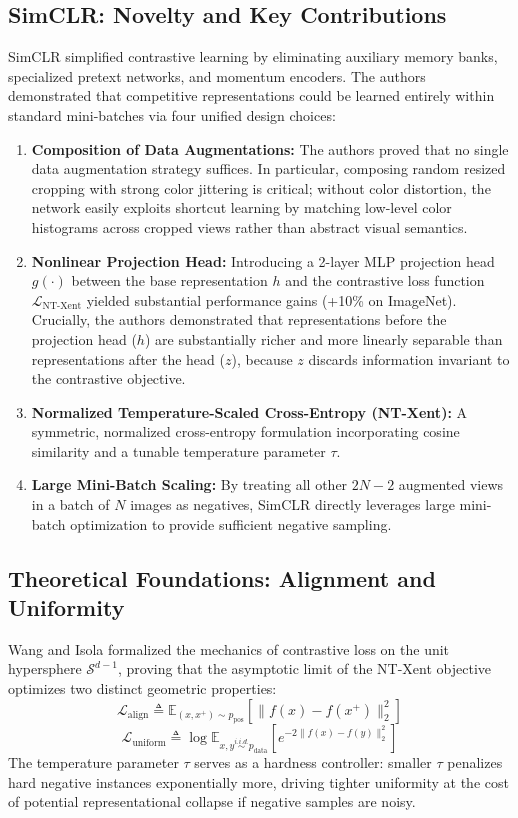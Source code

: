 \documentclass[conference]{IEEEtran}
\begin{document}
\subsection{SimCLR: Novelty and Key Contributions}
SimCLR \cite{chen2020simple} simplified contrastive learning by eliminating auxiliary memory banks, specialized pretext networks, and momentum encoders. The authors demonstrated that competitive representations could be learned entirely within standard mini-batches via four unified design choices:
\begin{enumerate}
    \item \textbf{Composition of Data Augmentations:} The authors proved that no single data augmentation strategy suffices. In particular, composing random resized cropping with strong color jittering is critical; without color distortion, the network easily exploits shortcut learning by matching low-level color histograms across cropped views rather than abstract visual semantics.
    \item \textbf{Nonlinear Projection Head:} Introducing a 2-layer MLP projection head $g(\cdot)$ between the base representation $h$ and the contrastive loss function $\mathcal{L}_{\text{NT-Xent}}$ yielded substantial performance gains (+10\% on ImageNet). Crucially, the authors demonstrated that representations before the projection head ($h$) are substantially richer and more linearly separable than representations after the head ($z$), because $z$ discards information invariant to the contrastive objective.
    \item \textbf{Normalized Temperature-Scaled Cross-Entropy (NT-Xent):} A symmetric, normalized cross-entropy formulation incorporating cosine similarity and a tunable temperature parameter $\tau$.
    \item \textbf{Large Mini-Batch Scaling:} By treating all other $2N-2$ augmented views in a batch of $N$ images as negatives, SimCLR directly leverages large mini-batch optimization to provide sufficient negative sampling.
\end{enumerate}

\subsection{Theoretical Foundations: Alignment and Uniformity}
Wang and Isola \cite{wang2020understanding} formalized the mechanics of contrastive loss on the unit hypersphere $\mathcal{S}^{d-1}$, proving that the asymptotic limit of the NT-Xent objective optimizes two distinct geometric properties:
\begin{equation}
\mathcal{L}_{\text{align}} \triangleq \mathbb{E}_{(x, x^{+}) \sim p_{\text{pos}}} \left[ \|f(x) - f(x^{+})\|_{2}^{2} \right]
\end{equation}
\begin{equation}
\mathcal{L}_{\text{uniform}} \triangleq \log \mathbb{E}_{x, y \stackrel{i.i.d.}{\sim} p_{\text{data}}} \left[ e^{-2\|f(x) - f(y)\|_{2}^{2}} \right]
\end{equation}
The temperature parameter $\tau$ serves as a hardness controller: smaller $\tau$ penalizes hard negative instances exponentially more, driving tighter uniformity at the cost of potential representational collapse if negative samples are noisy.
\end{document}
